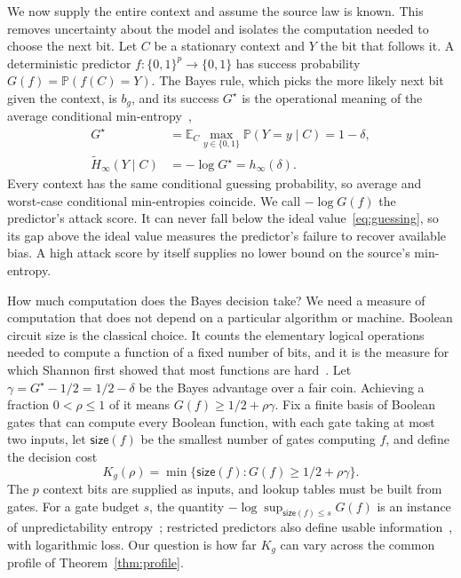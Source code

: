 \documentclass[11pt,a4paper]{article}
\newcommand{\bits}{\{0,1\}}
\newcommand{\E}{\mathbb{E}}
\newcommand{\PP}{\mathbb{P}}
\begin{document}
We now supply the entire context and assume the source law is known. This removes uncertainty about the model and isolates the computation needed to choose the next bit. Let \(C\) be a stationary context and \(Y\) the bit that follows it. A deterministic predictor \(f:\bits^p\to\bits\) has success probability \(G(f)=\PP(f(C)=Y)\). The Bayes rule, which picks the more likely next bit given the context, is \(b_g\), and its success \(G^\star\) is the operational meaning of the average conditional min-entropy~\cite{dodis2004fuzzy,konig2009operational},
\begin{equation}
\begin{aligned}
G^\star&=\E_C\max_{y\in\bits}\PP(Y=y\mid C)=1-\delta,\\
\widetilde H_\infty(Y\mid C)&=-\log G^\star=h_\infty(\delta).
\end{aligned}
\label{eq:guessing}
\end{equation}
Every context has the same conditional guessing probability, so average and worst-case conditional min-entropies coincide. We call \(-\log G(f)\) the predictor's attack score. It can never fall below the ideal value~\eqref{eq:guessing}, so its gap above the ideal value measures the predictor's failure to recover available bias. A high attack score by itself supplies no lower bound on the source's min-entropy.

How much computation does the Bayes decision take? We need a measure of computation that does not depend on a particular algorithm or machine. Boolean circuit size is the classical choice. It counts the elementary logical operations needed to compute a function of a fixed number of bits, and it is the measure for which Shannon first showed that most functions are hard~\cite{shannon1949synthesis}. Let \(\gamma=G^\star-1/2=1/2-\delta\) be the Bayes advantage over a fair coin. Achieving a fraction \(0<\rho\le1\) of it means \(G(f)\ge1/2+\rho\gamma\). Fix a finite basis of Boolean gates that can compute every Boolean function, with each gate taking at most two inputs, let \(\mathsf{size}(f)\) be the smallest number of gates computing \(f\), and define the decision cost
\begin{equation}
K_g(\rho)=\min\{\mathsf{size}(f):G(f)\ge1/2+\rho\gamma\}.
\label{eq:cost}
\end{equation}
The \(p\) context bits are supplied as inputs, and lookup tables must be built from gates. For a gate budget \(s\), the quantity \(-\log\sup_{\mathsf{size}(f)\le s}G(f)\) is an instance of unpredictability entropy~\cite{hsiao2007conditional}; restricted predictors also define usable information~\cite{xu2020usable}, with logarithmic loss. Our question is how far \(K_g\) can vary across the common profile of Theorem~\ref{thm:profile}.
\end{document}
